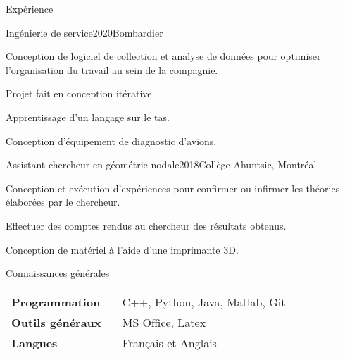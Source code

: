 \documentclass[french,12pt]{resume} %
\begin{document}
	\begin{rSection}{Expérience}
		
		\begin{rSubsection}{Ingénierie de service}{2020}{Bombardier}{}{}
			\item Conception de logiciel de collection et analyse de données pour optimiser l'organisation du travail au sein de la compagnie.
			\item Projet fait en conception itérative. 
			\item Apprentissage d'un langage sur le tas.
			\item Conception d'équipement de diagnostic d'avions.
		\end{rSubsection}
		
		\begin{rSubsection}{Assistant-chercheur en géométrie nodale}{2018}{Collège Ahuntsic, Montréal}{}
			\item 	Conception et exécution d'expériences pour confirmer ou infirmer les théories élaborées par le chercheur.
			\item   Effectuer des comptes rendus au chercheur des résultats obtenus.
			\item   Conception de matériel à l’aide d’une imprimante 3D.
		\end{rSubsection}
		
		
	\end{rSection}
	
	

	
	\begin{rSection}{Connaissances générales}
		
		\begin{tabular}{ @{} >{\bfseries}l @{\hspace{6ex}} l }
			Programmation \              & C++, Python, Java, Matlab, Git \\
			Outils généraux                 & MS Office, Latex \\
			Langues & Français et Anglais
		\end{tabular}
		
	\end{rSection}
	
	
\end{document}
